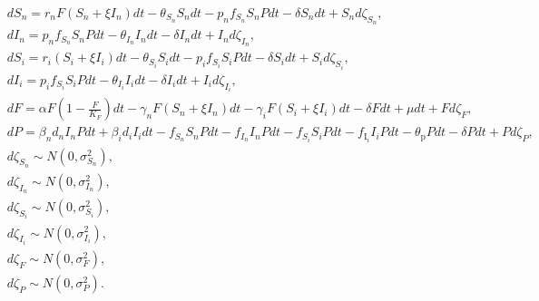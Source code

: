 \documentclass[12pt]{article}
\begin{document}
{
\small
\begin{align}
&d S_n = r_n F \left(S_n+\xi I_n\right)dt - \theta_{S_n}S_n dt - p_n f_{S_n} S_n Pdt - \delta S_ndt + S_n d\zeta_{S_n},\\
&d I_n = p_n f_{S_n} S_n Pdt - \theta_{I_n} I_ndt - \delta I_ndt + I_n d\zeta_{I_n},\\
&d S_i = r_i\left(S_i+\xi I_i\right)dt - \theta_{S_i} S_i dt - p_i f_{S_i} S_i Pdt - \delta S_idt + S_i d\zeta_{S_i},\\
&d I_i = p_i f_{S_i} S_i Pdt - \theta_{I_i} I_idt - \delta I_idt + I_i d\zeta_{I_i},\\
&dF = \alpha F\left(1-\frac{F}{K_F}\right)dt - \gamma_n F \left(S_n+\xi I_n\right) dt - \gamma_i F \left(S_i+\xi I_i\right) dt - \delta F dt + \mu dt + F d\zeta_F,\\
&d P = \beta_n d_n I_nPdt + \beta_i d_i I_idt - f_{S_n} S_n Pdt - f_{I_n} I_n Pdt - f_{S_i} S_i Pdt - f_{\mathrm{I}_i} I_i Pdt - \theta_{\mathrm{p}} Pdt - \delta P dt + P d\zeta_{P},\\
&d\zeta_{S_n} \sim N\left(0, \sigma_{S_n}^{2}\right),\\
&d\zeta_{I_n} \sim N\left(0, \sigma_{I_n}^{2}\right),\\
&d\zeta_{S_i} \sim N\left(0, \sigma_{S_i}^{2}\right),\\
&d\zeta_{I_i} \sim N\left(0, \sigma_{I_i}^{2}\right),\\
&d\zeta_{F} \sim N\left(0, \sigma_{F}^{2}\right),\\
&d\zeta_{P} \sim N\left(0, \sigma_{P}^{2}\right).
\end{align}
}
\end{document}
